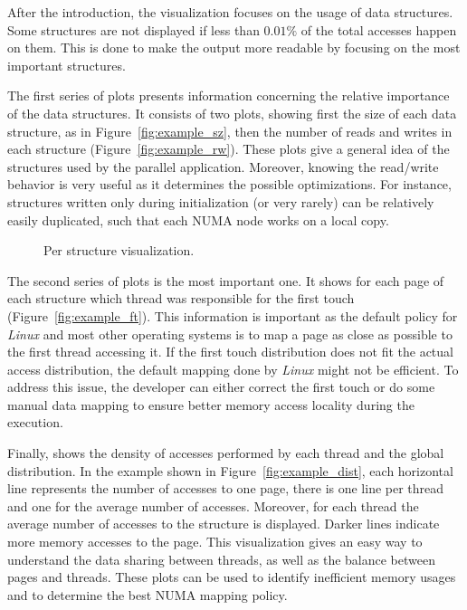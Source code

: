 After the introduction, the visualization focuses on the usage of data structures. Some
structures are not displayed if less than $0.01\%$ of the total accesses happen on them. This is
done to make the output more readable by focusing on the most important structures.

The first series of plots presents information concerning the relative
importance of the data structures. It consists of two plots, showing first the
size of each data structure, as in Figure~\ref{fig:example_sz}, then the
number of reads and writes  in each structure (Figure~\ref{fig:example_rw}). These plots give a
general idea of the structures used by the parallel application.
Moreover, knowing the read/write behavior is very
useful as it determines the possible optimizations. For instance, structures
written only during initialization (or very rarely) can be relatively easily
duplicated, such that each NUMA node works on a local copy.

\begin{figure}[!htb]
    \centering
    \caption{Per structure visualization.}
\end{figure}

The second series of plots is the most important one. It
shows for each page of each structure
which thread was responsible for the first touch
(Figure~\ref{fig:example_ft}). This information is important as the
default policy for \emph{Linux} and most other operating systems is to map a page as close as possible to the first
thread accessing it. If the first touch distribution does not fit the actual
access distribution, the default mapping done by \emph{Linux} might not be
efficient. To address this issue, the developer can either correct the first
touch or do some manual data mapping to ensure better memory access locality
during the execution.

Finally, \TABARNAC shows the density of accesses performed by each thread and
the global distribution. In the example shown in Figure~\ref{fig:example_dist}, each
horizontal line represents the number of accesses to one page, there is one
line per thread and one for the average number of accesses. Moreover, for each
thread the average number of accesses to the structure is displayed.
Darker lines indicate more memory accesses to the page. This visualization gives an easy way
to understand the data sharing between threads, as well as the balance between pages and
threads. These plots can be used to identify inefficient memory usages and to
determine the best NUMA mapping policy.

